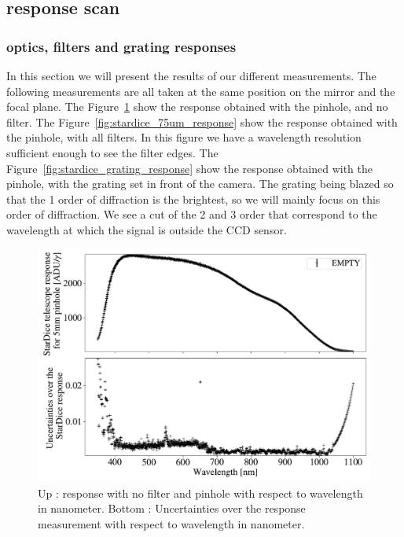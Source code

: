\subsection{\SD response scan}

\subsubsection{\SD optics, filters and grating responses}

In this section we will present the results of our different measurements. The following measurements are all taken at the same position on the mirror and the focal plane. The Figure~\ref{fig:stardice_5mm_response} show the \SD response obtained with the \bpinhole pinhole, and no filter. The Figure~\ref{fig:stardice_75um_response} show the \SD response obtained with the \spinhole pinhole, with all filters. In this figure we have a wavelength resolution sufficient enough to see the filter edges. The Figure~\ref{fig:stardice_grating_response} show the \SD response obtained with the \spinhole pinhole, with the grating set in front of the camera. The grating being blazed so that the 1 order of diffraction is the brightest, so we will mainly focus on this order of diffraction. We see a cut of the 2 and 3 order that correspond to the wavelength at which the signal is outside the CCD sensor.

\begin{figure}[h]
    \centering
    \includegraphics[width=\columnwidth]{fig/stardice_5mm_response.pdf}
    \caption{Up : \SD response with no filter and \bpinhole pinhole with respect to wavelength in nanometer. Bottom : Uncertainties over the \SD response measurement with respect to wavelength in nanometer.}
    \label{fig:stardice_5mm_response}
\end{figure}

